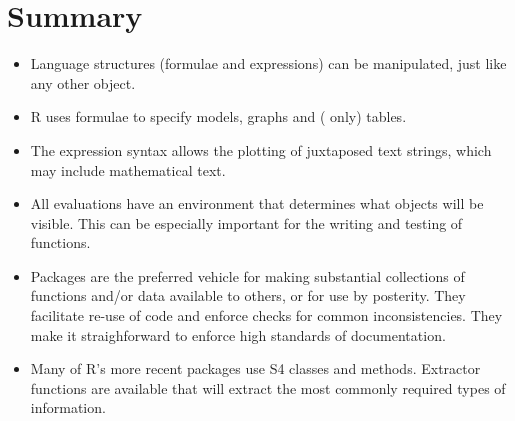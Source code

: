 \section{Summary}
\begin{itemize}
\item[] Language structures (formulae and expressions) can be manipulated,
just like any other object.

\item[] R uses formulae to specify models, graphs and (
only) tables.

\item[] The expression syntax allows the plotting of juxtaposed text
strings, which may include mathematical text.

\item[] All evaluations have an environment that determines what
  objects will be visible. This can be especially important for the
writing and testing of functions.

\item[] Packages are the preferred vehicle for making substantial
  collections of functions and/or data available to others, or for use
  by posterity.  They facilitate re-use of code and enforce checks for
  common inconsistencies. They make it straighforward to enforce high
  standards of documentation.

\item[] Many of R's more recent packages use S4 classes and methods.
Extractor functions are available that will extract the most 
commonly required types of information.

\end{itemize}
